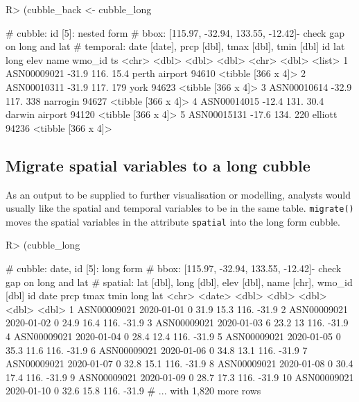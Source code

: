 \documentclass[
]{jss}
\begin{document}
\begin{CodeChunk}
\begin{CodeInput}
R> (cubble_back <- cubble_long %
\end{CodeInput}
\begin{CodeOutput}
# cubble:   id [5]: nested form
# bbox:     [115.97, -32.94, 133.55, -12.42]- check gap on long and lat
# temporal: date [date], prcp [dbl], tmax [dbl], tmin [dbl]
  id            lat  long  elev name           wmo_id ts                
  <chr>       <dbl> <dbl> <dbl> <chr>           <dbl> <list>            
1 ASN00009021 -31.9  116.  15.4 perth airport   94610 <tibble [366 x 4]>
2 ASN00010311 -31.9  117. 179   york            94623 <tibble [366 x 4]>
3 ASN00010614 -32.9  117. 338   narrogin        94627 <tibble [366 x 4]>
4 ASN00014015 -12.4  131.  30.4 darwin airport  94120 <tibble [366 x 4]>
5 ASN00015131 -17.6  134. 220   elliott         94236 <tibble [366 x 4]>
\end{CodeOutput}
\end{CodeChunk}

\hypertarget{migrate-spatial-variables-to-a-long-cubble}{%
\subsection{Migrate spatial variables to a long
cubble}\label{migrate-spatial-variables-to-a-long-cubble}}

As an output to be supplied to further visualisation or modelling,
analysts would usually like the spatial and temporal variables to be in
the same table. \texttt{migrate()} moves the spatial variables in the
attribute \texttt{spatial} into the long form cubble.

\begin{CodeChunk}
\begin{CodeInput}
R> (cubble_long %
\end{CodeInput}
\begin{CodeOutput}
# cubble:  date, id [5]: long form
# bbox:    [115.97, -32.94, 133.55, -12.42]- check gap on long and lat
# spatial: lat [dbl], long [dbl], elev [dbl], name [chr], wmo_id [dbl]
   id          date        prcp  tmax  tmin  long   lat
   <chr>       <date>     <dbl> <dbl> <dbl> <dbl> <dbl>
 1 ASN00009021 2020-01-01     0  31.9  15.3  116. -31.9
 2 ASN00009021 2020-01-02     0  24.9  16.4  116. -31.9
 3 ASN00009021 2020-01-03     6  23.2  13    116. -31.9
 4 ASN00009021 2020-01-04     0  28.4  12.4  116. -31.9
 5 ASN00009021 2020-01-05     0  35.3  11.6  116. -31.9
 6 ASN00009021 2020-01-06     0  34.8  13.1  116. -31.9
 7 ASN00009021 2020-01-07     0  32.8  15.1  116. -31.9
 8 ASN00009021 2020-01-08     0  30.4  17.4  116. -31.9
 9 ASN00009021 2020-01-09     0  28.7  17.3  116. -31.9
10 ASN00009021 2020-01-10     0  32.6  15.8  116. -31.9
# ... with 1,820 more rows
\end{CodeOutput}
\end{CodeChunk}
\end{document}
